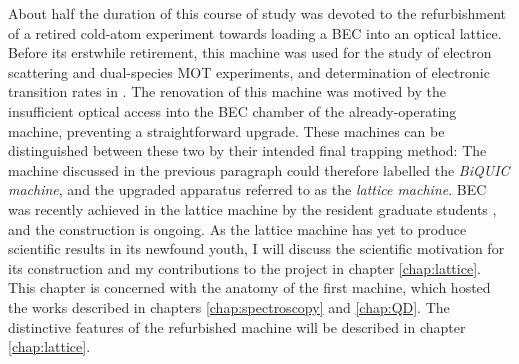 	About half the duration of this course of study was devoted to the refurbishment of a retired cold-atom experiment towards loading a \mhe BEC into an optical lattice. Before its erstwhile retirement, this machine was used for the study of electron scattering and  dual-species MOT experiments\cite{uhlmann05,byron10,byron10a}, and determination of electronic transition rates \cite{dall08,hodgman09,hodgman09a} in \mhe {}. The renovation of this machine was motived by the insufficient optical access into the BEC chamber of the already-operating machine, preventing a straightforward upgrade. These machines can be distinguished between these two by their intended final trapping method: The machine discussed in the previous paragraph could therefore labelled the \emph{BiQUIC machine}, and the upgraded apparatus referred to as the \emph{lattice machine}. BEC was recently achieved in the lattice machine by the resident graduate students \cite{abbas21}, and the construction is ongoing. As the lattice machine has yet to produce scientific results in its newfound youth, I will discuss the scientific motivation for its construction and my contributions to the project in chapter \ref{chap:lattice}. This chapter is concerned with the anatomy of the first machine, which hosted the works described in chapters \ref{chap:spectroscopy} and \ref{chap:QD}. The distinctive features of the refurbished machine will be described in chapter \ref{chap:lattice}.

